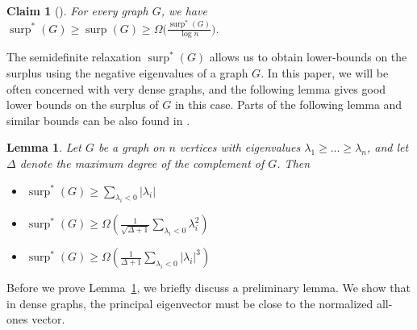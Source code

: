 \documentclass[11pt]{article}
\theoremstyle{plain}
\newtheorem{claim}[theorem]{Claim}
\newtheorem{lemma}[theorem]{Lemma}
\theoremstyle{definition}
\DeclareMathOperator{\surp}{surp}
\begin{document}
\begin{claim}[\cite{RT}]
For every graph $G$, we have $\surp^*(G)\geq \surp(G)\geq \Omega\Big(\frac{\surp^*(G)}{\log n}\Big)$.
\end{claim}

The semidefinite relaxation $\surp^*(G)$ allows us to obtain lower-bounds on the surplus using the negative eigenvalues of a graph $G$. In this paper, we will be often concerned with very dense graphs, and the following lemma gives good lower bounds on the surplus of $G$ in this case. Parts of the following lemma and similar bounds can be also found in \cite{RST,RT,Zhang}.

\begin{lemma}\label{lemma:surp_star}
Let $G$ be a graph on $n$ vertices with eigenvalues $\lambda_1\geq \dots\geq \lambda_n$, and let $\Delta$ denote the maximum degree of the complement of $G$. Then
\begin{itemize}
    \item[(i)] $\surp^*(G)\geq \sum_{\lambda_i<0}|\lambda_i|$
    \item[(ii)] $\surp^*(G)\geq \Omega\left(\frac{1}{\sqrt{\Delta+1}}\sum_{\lambda_i<0}\lambda_i^2\right)$
    \item[(iii)]  $\surp^*(G)\geq \Omega\left(\frac{1}{\Delta+1}\sum_{\lambda_i<0}|\lambda_i|^3\right)$
\end{itemize}
\end{lemma}

Before we prove Lemma~\ref{lemma:surp_star}, we briefly discuss a preliminary lemma. We show that in dense graphs, the principal eigenvector must be close to the normalized all-ones vector.
\end{document}

